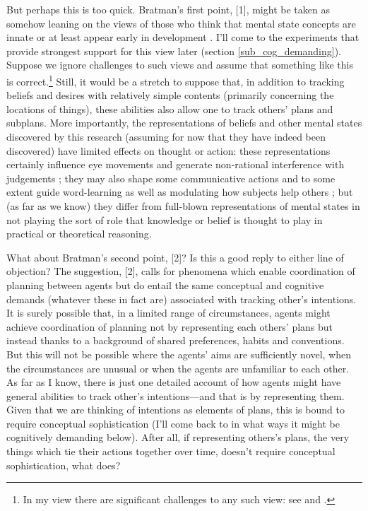 \documentclass[12pt,letterpaper]{extarticle}
\begin{document}
But perhaps this is too quick.
Bratman's first point, [1], might be taken as somehow leaning on the views of those who think that mental state concepts are innate or at least appear early in development 
\citep[e.g.][]{Baillargeon:gx,Leslie:2005ef}.
I'll come to the experiments that provide strongest support for this view later (section \vref{sub_cog_demanding}).
Suppose we ignore challenges to such views and assume that something like this is correct.\footnote{
In my view there are significant challenges to any such view: see \citet{Apperly:2009ju} and \citet{butterfill_minimal}.
}
Still, it would be a stretch to suppose that, in addition to tracking beliefs and desires with relatively simple contents (primarily concerning the locations of things), these abilities also allow one to track others' plans and subplans.
More importantly, the representations of beliefs and other mental states discovered by this research (assuming for now that they have indeed been discovered) have limited effects on thought or action:
these representations certainly influence eye movements \citep{Clements:1994cw} and generate non-rational interference with judgements \citep{kovacs_social_2010}; they may also shape some communicative actions \citep{Liszkowski:2008al} and to some extent guide word-learning \citep{Carpenter:2002gc} as well as modulating how subjects help others \citep{Buttelmann:2009gy}; but (as far as we know) they differ from full-blown representations of mental states in not playing the sort of role that knowledge or belief is thought to play in practical or theoretical reasoning.


What about Bratman's second point,  [2]?
Is this a good reply to either line of objection?
The suggestion, [2], calls for phenomena which enable coordination of planning between agents but do entail the same conceptual and cognitive demands (whatever these in fact are) associated with  tracking other's intentions.
It is surely possible that, in a limited range of circumstances, agents might achieve coordination of planning not by representing each others' plans but instead thanks to a background of shared preferences, habits and conventions.
But this will not be possible where the agents' aims are sufficiently novel, when the circumstances are unusual or when the agents are unfamiliar to each other.
As far as I know, there is just one detailed account of how agents might have general abilities to track other's intentions---and that is by representing them.
Given that we are thinking of intentions as elements of plans, this is bound to require conceptual sophistication (I'll come back to in what ways it might be cognitively demanding below).
After all, if representing others's plans, the very things which tie their actions together over time, doesn't require conceptual sophistication, what does?
\end{document}
